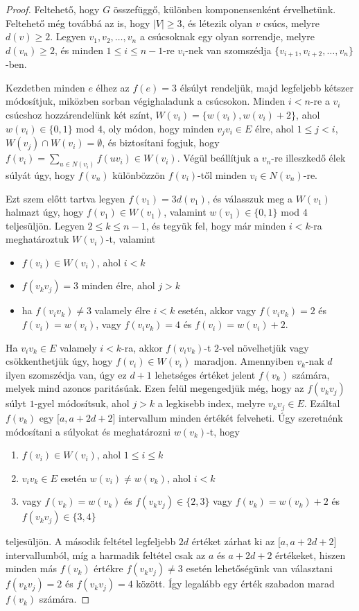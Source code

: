 \documentclass[12pt, a4paper]{report}
\theoremstyle{remark}
\theoremstyle{definition}
\begin{document}
\begin{proof}
Feltehető, hogy $G$ összefüggő, különben komponensenként érvelhetünk. Feltehető még továbbá az is, hogy $|V| \geq 3$, és létezik olyan $v$ csúcs, melyre $d(v) \geq 2$. Legyen $v_1, v_2, \ldots, v_n$ a csúcsoknak egy olyan sorrendje, melyre $d(v_n) \geq 2$, és minden $1 \leq i \leq n-1$-re $v_i$-nek van szomszédja $\lbrace v_{i+1}, v_{i+2}, \ldots, v_n \rbrace$-ben.

Kezdetben minden $e$ élhez az $f(e) = 3$ élsúlyt rendeljük, majd legfeljebb kétszer módosítjuk, miközben sorban végighaladunk a csúcsokon. Minden $i < n$-re a $v_i$ csúcshoz hozzárendelünk két színt, $W(v_i) = \lbrace w(v_i), w(v_i) +2 \rbrace$, ahol $w(v_i) \in \lbrace 0, 1 \rbrace$ mod $4$, oly módon, hogy minden $v_j v_i \in E$ élre, ahol $1 \leq j < i$, $W(v_j) \cap W(v_i) = \emptyset$, és biztosítani fogjuk, hogy $f(v_i) = \sum\limits_{u \in N(v_i)} f(uv_i) \in W(v_i)$. Végül beállítjuk a $v_n$-re illeszkedő élek súlyát úgy, hogy $f(v_n)$ különbözzön $f(v_i)$-től minden $v_i \in N(v_n)$-re.

Ezt szem előtt tartva legyen $f(v_1) = 3d(v_1)$, és válasszuk meg a $W(v_1)$ halmazt úgy, hogy $f(v_1) \in W(v_1)$, valamint $w(v_1) \in \lbrace 0, 1 \rbrace$ mod $4$ teljesüljön. Legyen $2 \leq k \leq n - 1$, és tegyük fel, hogy már minden $i < k$-ra meghatároztuk $W(v_i)$-t, valamint
\begin{itemize}
\item $f(v_i) \in W(v_i)$, ahol $i < k$
\item $f(v_k v_j) = 3$ minden élre, ahol $j > k$
\item ha $f(v_i v_k) \neq 3$ valamely élre $i < k$ esetén, akkor vagy $f(v_i v_k) = 2$ és $f(v_i) = w(v_i)$, vagy $f(v_i v_k) = 4$ és $f(v_i) = w(v_i) + 2$.
\end{itemize}

Ha $v_i v_k \in E$ valamely $i < k$-ra, akkor $f(v_i v_k)$-t $2$-vel növelhetjük vagy csökkenthetjük úgy, hogy $f(v_i) \in W(v_i)$ maradjon. Amennyiben $v_k$-nak $d$ ilyen szomszédja van, úgy ez $d + 1$ lehetséges értéket jelent $f(v_k)$ számára, melyek mind azonos paritásúak. Ezen felül megengedjük még, hogy az $f(v_k v_j)$ súlyt $1$-gyel módosítsuk, ahol $j > k$ a legkisebb index, melyre $v_k v_j \in E$. Ezáltal $f(v_k)$ egy $\lbrack a, a + 2d + 2 \rbrack$ intervallum minden értékét felveheti. Úgy szeretnénk módosítani a súlyokat és meghatározni $w(v_k)$-t, hogy
\begin{enumerate}
\item $f(v_i) \in W(v_i)$, ahol $1 \leq i \leq k$
\item $v_i v_k \in E$ esetén $w(v_i) \neq w(v_k)$, ahol $i < k$
\item vagy $f(v_k) = w(v_k)$ és $f(v_k v_j) \in \lbrace 2, 3 \rbrace$ vagy $f(v_k) = w(v_k) + 2$ és $f(v_k v_j) \in \lbrace 3, 4 \rbrace$
\end{enumerate}
teljesüljön. A második feltétel legfeljebb $2d$ értéket zárhat ki az $\lbrack a, a + 2d + 2 \rbrack$ intervallumból, míg a harmadik feltétel csak az $a$ és $a + 2d + 2$ értékeket, hiszen minden más $f(v_k)$ értékre $f(v_k v_j) \neq 3$ esetén lehetőségünk van választani $f(v_k v_j) = 2$ és $f(v_k v_j) = 4$ között. Így legalább egy érték szabadon marad $f(v_k)$ számára.


\end{proof}
\end{document}
